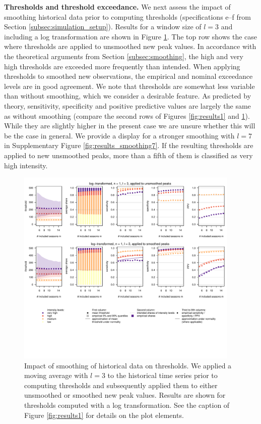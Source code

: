 \documentclass{article}
\begin{document}
\textbf{Thresholds and threshold exceedance.} We next assess the impact of smoothing historical data prior to computing thresholds (specifications e--f from Section \ref{subsec:simulation_setup}). Results for a window size of $l = 3$ and including a log transformation are shown in Figure \ref{fig:results_smoothing}. The top row shows the case where thresholds are applied to unsmoothed new peak values. In accordance with the theoretical arguments from Section \ref{subsec:smoothing}, the high and very high thresholds are exceeded more frequently than intended. When applying thresholds to smoothed new observations, the empirical and nominal exceedance levels are in good agreement. We note that thresholds are somewhat less variable than without smoothing, which we consider a desirable feature. As predicted by theory, sensitivity, specificity and positive predictive values are largely the same as without smoothing (compare the second rows of Figures \ref{fig:results1} and \ref{fig:results_smoothing}). While they are slightly higher in the present case we are unsure whether this will be the case in general. We provide a display for a stronger smoothing with $l = 7$ in Supplementary Figure \ref{fig:results_smoothing7}. If the resulting thresholds are applied to new unsmoothed peaks, more than a fifth of them is classified as very high intensity.

\begin{figure}[h!]
\centering
\includegraphics[width=0.95\textwidth]{figure/plot_smoothing3_fr_small.pdf}
\vspace{-30mm}

\caption{Impact of smoothing of historical data on thresholds. We applied a moving average with $l = 3$ to the historical time series prior to computing thresholds and subsequently applied them to either unsmoothed or smoothed new peak values. Results are shown for thresholds computed with a log transformation. See the caption of Figure \ref{fig:results1} for details on the plot elements.}
\label{fig:results_smoothing}
\end{figure}
\end{document}
